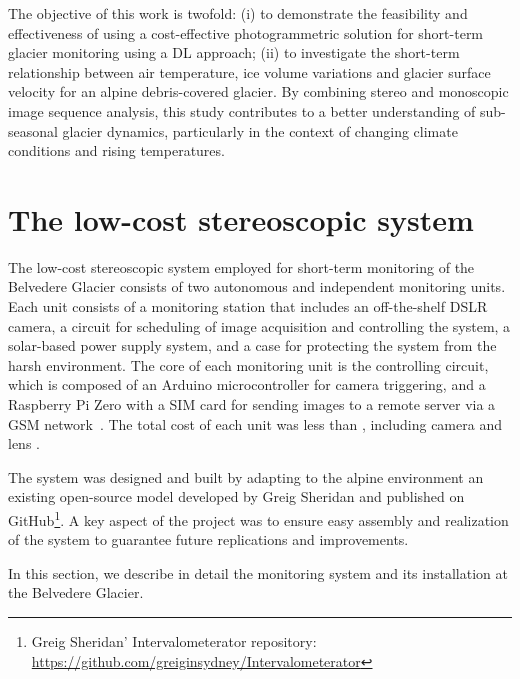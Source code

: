 The objective of this work is twofold:
(i) to demonstrate the feasibility and effectiveness of using a cost-effective
photogrammetric solution for short-term glacier monitoring using a DL approach;
(ii) to investigate the short-term relationship between air temperature, ice volume variations and glacier surface velocity for an alpine debris-covered glacier.
By combining stereo and monoscopic image sequence analysis, this study
contributes to a better understanding of sub-seasonal glacier dynamics,
particularly in the context of changing climate conditions and rising temperatures.

\section{The low-cost stereoscopic system}\label{sec:4:system}

The low-cost stereoscopic system employed for short-term monitoring of the Belvedere Glacier consists of two autonomous and independent monitoring units. 
Each unit consists of a monitoring station that includes an off-the-shelf DSLR camera, a circuit for scheduling of image acquisition and controlling the system, a solar-based power supply system, and a case for protecting the system from the harsh environment. 
The core of each monitoring unit is the controlling circuit, which is composed of an Arduino microcontroller for camera triggering, and a Raspberry Pi Zero with a SIM card for sending images to a remote server via a GSM network~.
The total cost of each unit was less than , including camera and lens \citep{ioli2023_replicable}.

The system was designed and built by adapting to the alpine environment an existing open-source model developed by Greig Sheridan and published on
GitHub\footnote{\label{foot:greig}Greig Sheridan' Intervalometerator repository:
  \url{https://github.com/greiginsydney/Intervalometerator}}.
A key aspect of the project was to ensure easy assembly and realization of the system to guarantee future replications and improvements.

In this section, we describe in detail the monitoring system and its installation at the Belvedere Glacier.


